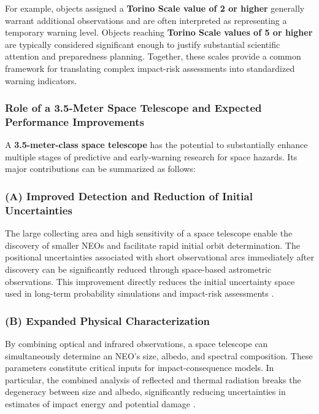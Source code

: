 For example, objects assigned a \textbf{Torino Scale value of 2 or higher} generally warrant additional observations and are often interpreted as representing a temporary warning level. Objects reaching \textbf{Torino Scale values of 5 or higher} are typically considered significant enough to justify substantial scientific attention and preparedness planning. Together, these scales provide a common framework for translating complex impact-risk assessments into standardized warning indicators.

\subsubsection{Role of a 3.5-Meter Space Telescope and Expected Performance Improvements}

A \textbf{3.5-meter-class space telescope} has the potential to substantially enhance multiple stages of predictive and early-warning research for space hazards. Its major contributions can be summarized as follows:

\subsubsection{(A) Improved Detection and Reduction of Initial Uncertainties}\label{a-improved-detection-and-reduction-of-initial-uncertainties}

The large collecting area and high sensitivity of a space telescope enable the discovery of smaller NEOs and facilitate rapid initial orbit determination. The positional uncertainties associated with short observational arcs immediately after discovery can be significantly reduced through space-based astrometric observations. This improvement directly reduces the initial uncertainty space used in long-term probability simulations and impact-risk assessments \cite{milani2005}.

\subsubsection{(B) Expanded Physical Characterization}\label{b-expanded-physical-characterization}

By combining optical and infrared observations, a space telescope can simultaneously determine an NEO's size, albedo, and spectral composition. These parameters constitute critical inputs for impact-consequence models. In particular, the combined analysis of reflected and thermal radiation breaks the degeneracy between size and albedo, significantly reducing uncertainties in estimates of impact energy and potential damage \cite{mainzer2011}.

